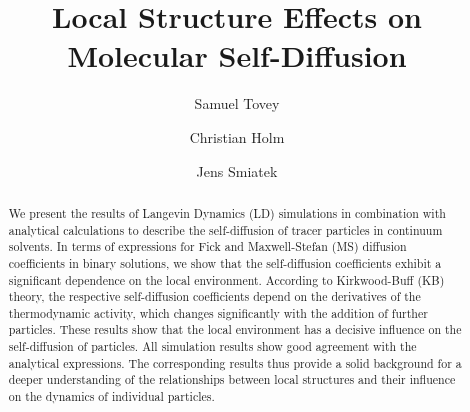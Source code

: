 \documentclass[aip,jcp,reprint]{revtex4-1}
\begin{document}
\title{Local Structure Effects on Molecular Self-Diffusion}
\author{Samuel Tovey}
\author{Christian Holm}
\author{Jens Smiatek}

\begin{abstract}
	We present the results of Langevin Dynamics (LD) simulations in combination with analytical calculations to describe the self-diffusion of tracer particles in continuum solvents.
	In terms of expressions for Fick and Maxwell-Stefan (MS) diffusion coefficients in binary solutions, we show that the self-diffusion coefficients exhibit a significant dependence on the local environment.
	According to Kirkwood-Buff (KB) theory, the respective self-diffusion coefficients depend on the derivatives of the thermodynamic activity, which changes significantly with the addition of further particles.
	These results show that the local environment has a decisive influence on the self-diffusion of particles.
	All simulation results show good agreement with the analytical expressions.
	The corresponding results thus provide a solid background for a deeper understanding of the relationships between local structures and their influence on the dynamics of individual particles.
\end{abstract}

\maketitle


\end{document}
